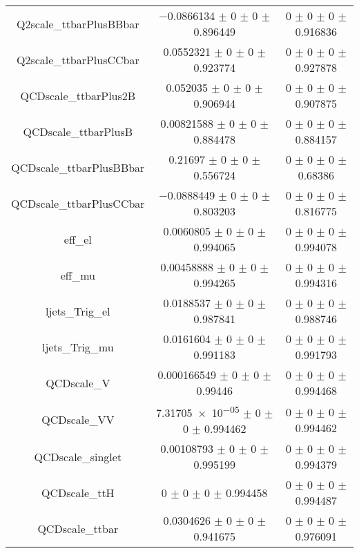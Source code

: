 \begin{table}
\begin{tabular}{ccc}
Q2scale\_ttbarPlusBBbar & \num{-0.0866134} $\pm$ \num{0} $\pm$ \num{0} $\pm$ \num{0.896449} & \num{0} $\pm$ \num{0} $\pm$ \num{0} $\pm$ \num{0.916836}\\
Q2scale\_ttbarPlusCCbar & \num{0.0552321} $\pm$ \num{0} $\pm$ \num{0} $\pm$ \num{0.923774} & \num{0} $\pm$ \num{0} $\pm$ \num{0} $\pm$ \num{0.927878}\\
QCDscale\_ttbarPlus2B & \num{0.052035} $\pm$ \num{0} $\pm$ \num{0} $\pm$ \num{0.906944} & \num{0} $\pm$ \num{0} $\pm$ \num{0} $\pm$ \num{0.907875}\\
QCDscale\_ttbarPlusB & \num{0.00821588} $\pm$ \num{0} $\pm$ \num{0} $\pm$ \num{0.884478} & \num{0} $\pm$ \num{0} $\pm$ \num{0} $\pm$ \num{0.884157}\\
QCDscale\_ttbarPlusBBbar & \num{0.21697} $\pm$ \num{0} $\pm$ \num{0} $\pm$ \num{0.556724} & \num{0} $\pm$ \num{0} $\pm$ \num{0} $\pm$ \num{0.68386}\\
QCDscale\_ttbarPlusCCbar & \num{-0.0888449} $\pm$ \num{0} $\pm$ \num{0} $\pm$ \num{0.803203} & \num{0} $\pm$ \num{0} $\pm$ \num{0} $\pm$ \num{0.816775}\\
eff\_el & \num{0.0060805} $\pm$ \num{0} $\pm$ \num{0} $\pm$ \num{0.994065} & \num{0} $\pm$ \num{0} $\pm$ \num{0} $\pm$ \num{0.994078}\\
eff\_mu & \num{0.00458888} $\pm$ \num{0} $\pm$ \num{0} $\pm$ \num{0.994265} & \num{0} $\pm$ \num{0} $\pm$ \num{0} $\pm$ \num{0.994316}\\
ljets\_Trig\_el & \num{0.0188537} $\pm$ \num{0} $\pm$ \num{0} $\pm$ \num{0.987841} & \num{0} $\pm$ \num{0} $\pm$ \num{0} $\pm$ \num{0.988746}\\
ljets\_Trig\_mu & \num{0.0161604} $\pm$ \num{0} $\pm$ \num{0} $\pm$ \num{0.991183} & \num{0} $\pm$ \num{0} $\pm$ \num{0} $\pm$ \num{0.991793}\\
QCDscale\_V & \num{0.000166549} $\pm$ \num{0} $\pm$ \num{0} $\pm$ \num{0.99446} & \num{0} $\pm$ \num{0} $\pm$ \num{0} $\pm$ \num{0.994468}\\
QCDscale\_VV & \num{7.31705e-05} $\pm$ \num{0} $\pm$ \num{0} $\pm$ \num{0.994462} & \num{0} $\pm$ \num{0} $\pm$ \num{0} $\pm$ \num{0.994462}\\
QCDscale\_singlet & \num{0.00108793} $\pm$ \num{0} $\pm$ \num{0} $\pm$ \num{0.995199} & \num{0} $\pm$ \num{0} $\pm$ \num{0} $\pm$ \num{0.994379}\\
QCDscale\_ttH & \num{0} $\pm$ \num{0} $\pm$ \num{0} $\pm$ \num{0.994458} & \num{0} $\pm$ \num{0} $\pm$ \num{0} $\pm$ \num{0.994487}\\
QCDscale\_ttbar & \num{0.0304626} $\pm$ \num{0} $\pm$ \num{0} $\pm$ \num{0.941675} & \num{0} $\pm$ \num{0} $\pm$ \num{0} $\pm$ \num{0.976091}\\

\end{tabular}
\end{table}
